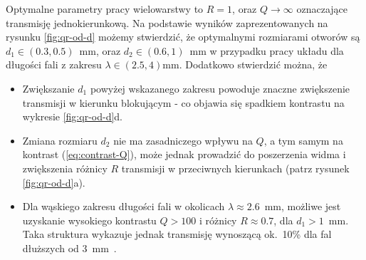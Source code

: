 Optymalne parametry pracy wielowarstwy to $R=1$, oraz $Q \to \infty$ oznaczające transmisję jednokierunkową. Na podstawie wyników zaprezentowanych na rysunku \ref{fig:qr-od-d} możemy stwierdzić, że optymalnymi rozmiarami otworów są $d_1\in(0.3,0.5)$~mm, oraz $d_2\in(0.6,1)$~mm w przypadku pracy układu dla długości fali z zakresu $\lambda \in (2.5, 4)$mm. Dodatkowo stwierdzić można, że
\begin{itemize}
	\item Zwiększanie $d_1$ powyżej wskazanego zakresu powoduje znaczne zwiększenie transmisji w kierunku blokującym - co objawia się spadkiem kontrastu na wykresie \ref{fig:qr-od-d}d.
	\item Zmiana rozmiaru $d_2$ nie ma zasadniczego wpływu na $Q$, a tym samym na kontrast (\ref{eq:contrast-Q}), może jednak prowadzić do poszerzenia widma i zwiększenia różnicy $R$ transmisji w przeciwnych kierunkach (patrz rysunek \ref{fig:qr-od-d}a).
	\item Dla wąskiego zakresu długości fali w okolicach $\lambda\approx2.6$~mm, możliwe jest uzyskanie wysokiego kontrastu $Q>100$ i różnicy $R\approx 0.7$, dla $d_1>1$~mm. Taka struktura wykazuje jednak transmisję wynoszącą ok.~10\% dla fal dłuższych od $3$~mm~\cite{stolarek2013broadband}.
\end{itemize}
